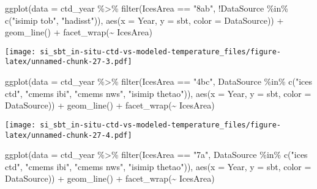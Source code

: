 \documentclass[
]{article}
\newenvironment{Shaded}{\begin{snugshade}}{\end{snugshade}}
\newcommand{\AttributeTok}[1]{\textcolor[rgb]{0.77,0.63,0.00}{#1}}
\newcommand{\FunctionTok}[1]{\textcolor[rgb]{0.00,0.00,0.00}{#1}}
\newcommand{\NormalTok}[1]{#1}
\newcommand{\SpecialCharTok}[1]{\textcolor[rgb]{0.00,0.00,0.00}{#1}}
\newcommand{\StringTok}[1]{\textcolor[rgb]{0.31,0.60,0.02}{#1}}
\begin{document}
\begin{Shaded}
\begin{Highlighting}[]
\FunctionTok{ggplot}\NormalTok{(}\AttributeTok{data =}\NormalTok{ ctd\_year }\SpecialCharTok{\%\textgreater{}\%} \FunctionTok{filter}\NormalTok{(IcesArea }\SpecialCharTok{==} \StringTok{"8ab"}\NormalTok{, }\SpecialCharTok{!}\NormalTok{DataSource }\SpecialCharTok{\%in\%} \FunctionTok{c}\NormalTok{(}\StringTok{"isimip tob"}\NormalTok{, }\StringTok{"hadisst"}\NormalTok{)), }\FunctionTok{aes}\NormalTok{(}\AttributeTok{x =}\NormalTok{ Year, }\AttributeTok{y =}\NormalTok{ sbt, }\AttributeTok{color =}\NormalTok{ DataSource)) }\SpecialCharTok{+} \FunctionTok{geom\_line}\NormalTok{() }\SpecialCharTok{+} \FunctionTok{facet\_wrap}\NormalTok{(}\SpecialCharTok{\textasciitilde{}}\NormalTok{ IcesArea) }
\end{Highlighting}
\end{Shaded}

\texttt{[image: si\_sbt\_in-situ-ctd-vs-modeled-temperature\_files/figure-latex/unnamed-chunk-27-3.pdf]}

\begin{Shaded}
\begin{Highlighting}[]
\FunctionTok{ggplot}\NormalTok{(}\AttributeTok{data =}\NormalTok{ ctd\_year }\SpecialCharTok{\%\textgreater{}\%} \FunctionTok{filter}\NormalTok{(IcesArea }\SpecialCharTok{==} \StringTok{"4bc"}\NormalTok{, DataSource }\SpecialCharTok{\%in\%} \FunctionTok{c}\NormalTok{(}\StringTok{"ices ctd"}\NormalTok{, }\StringTok{"cmems ibi"}\NormalTok{, }\StringTok{"cmems nws"}\NormalTok{, }\StringTok{"isimip thetao"}\NormalTok{)), }\FunctionTok{aes}\NormalTok{(}\AttributeTok{x =}\NormalTok{ Year, }\AttributeTok{y =}\NormalTok{ sbt, }\AttributeTok{color =}\NormalTok{ DataSource)) }\SpecialCharTok{+} \FunctionTok{geom\_line}\NormalTok{() }\SpecialCharTok{+} \FunctionTok{facet\_wrap}\NormalTok{(}\SpecialCharTok{\textasciitilde{}}\NormalTok{ IcesArea)}
\end{Highlighting}
\end{Shaded}

\texttt{[image: si\_sbt\_in-situ-ctd-vs-modeled-temperature\_files/figure-latex/unnamed-chunk-27-4.pdf]}

\begin{Shaded}
\begin{Highlighting}[]
\FunctionTok{ggplot}\NormalTok{(}\AttributeTok{data =}\NormalTok{ ctd\_year }\SpecialCharTok{\%\textgreater{}\%} \FunctionTok{filter}\NormalTok{(IcesArea }\SpecialCharTok{==} \StringTok{"7a"}\NormalTok{, DataSource }\SpecialCharTok{\%in\%} \FunctionTok{c}\NormalTok{(}\StringTok{"ices ctd"}\NormalTok{, }\StringTok{"cmems ibi"}\NormalTok{, }\StringTok{"cmems nws"}\NormalTok{, }\StringTok{"isimip thetao"}\NormalTok{)), }\FunctionTok{aes}\NormalTok{(}\AttributeTok{x =}\NormalTok{ Year, }\AttributeTok{y =}\NormalTok{ sbt, }\AttributeTok{color =}\NormalTok{ DataSource)) }\SpecialCharTok{+} \FunctionTok{geom\_line}\NormalTok{() }\SpecialCharTok{+} \FunctionTok{facet\_wrap}\NormalTok{(}\SpecialCharTok{\textasciitilde{}}\NormalTok{ IcesArea)}
\end{Highlighting}
\end{Shaded}
\end{document}
